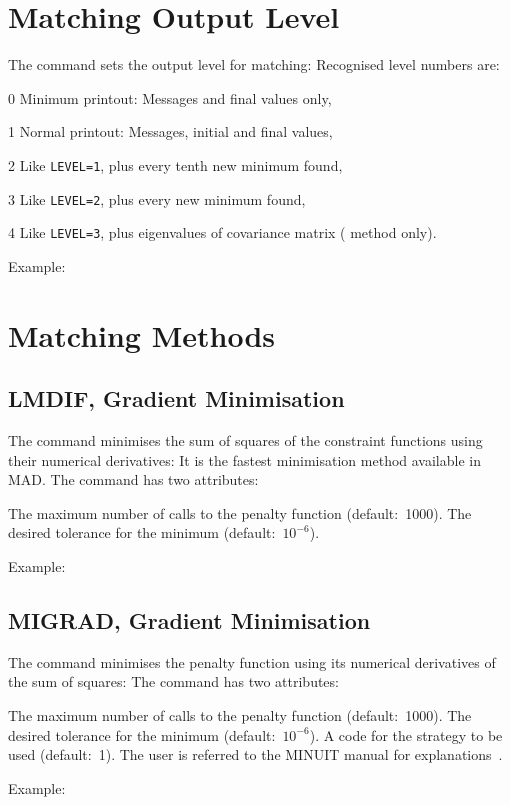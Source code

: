 \section{Matching Output Level}
\label{S-LEVCMD}
The  command sets the output level for matching:
Recognised level numbers are:
\begin{mylist}
\item[0]
Minimum printout: Messages and final values only,
\item[1]
Normal printout: Messages, initial and final values,
\item[2]
Like {\tt LEVEL=1}, plus every tenth new minimum found,
\item[3]
Like {\tt LEVEL=2}, plus every new minimum found,
\item[4]
Like {\tt LEVEL=3}, plus eigenvalues of covariance matrix
( method only).
\end{mylist}
Example:
 
\section{Matching Methods}
\label{S-MATMET}

\subsection{LMDIF, Gradient Minimisation}
The  command minimises the sum of squares of the constraint
functions using their numerical derivatives:
It is the fastest minimisation method available in MAD.
The command has two attributes:
\begin{mylist}
The maximum number of calls to the penalty function (default:~1000).
The desired tolerance for the minimum (default:~\(10^{-6}\)).
\end{mylist}
Example:

\subsection{MIGRAD, Gradient Minimisation}
The  command minimises the penalty
function using its numerical derivatives of the sum of squares:
The command has two attributes:
\begin{mylist}
The maximum number of calls to the penalty function (default:~1000).
The desired tolerance for the minimum (default:~\(10^{-6}\)).
A code for the strategy to be used (default:~1).
The user is referred to the MINUIT manual for explanations~\cite{B-JAM71}.
\end{mylist}
Example:

